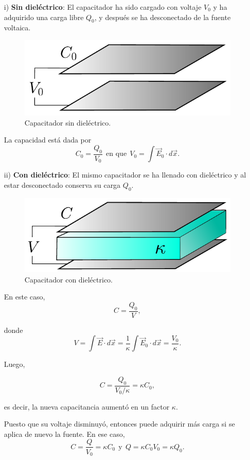 \begin{itemize}
\item[i)] \textbf{Sin dieléctrico}: El capacitador ha sido cargado con voltaje $V_0$ y ha adquirido una carga libre $Q_0$, y después se ha desconectado de la fuente voltaica.

\begin{figure}[H]
    \centering
    \includegraphics[scale = 0.6]{Figuras/Capacitador-Sin-Dielectric.pdf}
    \caption{Capacitador sin dieléctrico.}
    \label{fig:Cap-Sin-Dielectrico}
\end{figure}

La capacidad está dada por
$$C_0 = \frac{Q_0}{V_0} ~~\mbox{en que}~~ V_0 = \int \vec{E}_0 \cdot d\vec{x}.$$

\item[ii)] \textbf{Con dieléctrico}: El mismo capacitador se ha llenado con dieléctrico y al estar desconectado conserva su carga $Q_0$.

\begin{figure}[H]
    \centering
    \includegraphics[scale = 0.6]{Figuras/Capacitador-ConDielectrico.pdf}
    \caption{Capacitador con dieléctrico.}
    \label{fig:Cap-Con-Dielectrico}
\end{figure}

 En este caso,
$$C = \frac{Q_0}{V},$$

donde 
$$V = \int \vec{E} \cdot d\vec{x} = \frac{1}{\kappa}\int \vec{E}_0 \cdot d\vec{x} = \frac{V_0}{\kappa}. $$

Luego,
\begin{shaded}
 $$C = \frac{Q_0}{V_0 / \kappa} = \kappa C_0,$$   
\end{shaded}

es decir, la nueva capacitancia aumentó en un factor $\kappa$. 

Puesto que su voltaje disminuyó, entonces puede adquirir más carga si se aplica de nuevo la fuente. En ese caso,
\begin{equation*}
C = \frac{Q}{V_0} = \kappa C_0 ~~\mbox{y}~~ Q = \kappa C_0 V_0 = \kappa Q_0.
\end{equation*}

\end{itemize}

